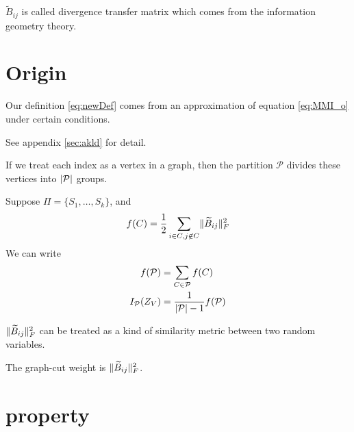 \documentclass{article}
\def\P{\mathcal{P}}
\DeclarePairedDelimiter\abs{\lvert}{\rvert}
\DeclarePairedDelimiter\norm{\lVert}{\rVert}
\theoremstyle{definition}
\begin{document}
$\widetilde{B}_{ij}$ is called divergence transfer matrix which comes from the information geometry theory.

\section{Origin}
Our definition \eqref{eq:newDef} comes from an approximation of equation \eqref{eq:MMI_o} under certain conditions.

See appendix \ref{sec:akld} for detail.

If we treat each index as a vertex in a graph, then the partition $\P$ divides these vertices into $\abs{\P}$ groups. 

Suppose $\Pi = \{S_1, \dots, S_k\}$, and 
\begin{equation}
f(C) = {1 \over 2}\sum_{i\in C, j \not\in C} \norm{\widetilde{B}_{ij}}_F^2
\end{equation}
We can write 
\begin{align}
f(\P) & = \sum_{C \in \P} f(C) \\
I_{\mathcal{P}}(Z_V)  &= { 1 \over \abs{\P}  - 1}f(\P) 
\end{align}

$\norm{\widetilde{B}_{ij}}_F^2$ can be treated as a kind of similarity metric between two random variables.

The graph-cut weight is $\norm{\widetilde{B}_{ij}}_F^2$.

\section{property}
\end{document}
